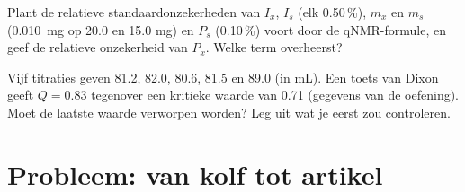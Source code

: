 \begin{exercise}[$\star\star\star$]\label{exo:b3:lab-techniques-3:11}
Plant de relatieve standaardonzekerheden van $I_x$, $I_s$ (elk 0.50\,\%), $m_x$ en $m_s$ (\qty{0.010}{mg} op 20.0
en 15.0 mg) en $P_s$ (0.10\,\%) voort door de qNMR-formule, en geef de relatieve onzekerheid van $P_x$.
Welke term overheerst?
\end{exercise}

\begin{exercise}[$\star\star\star$]\label{exo:b3:lab-techniques-3:12}
Vijf titraties geven 81.2, 82.0, 80.6, 81.5 en 89.0 (in mL). Een toets van
Dixon geeft
$Q = 0.83$ tegenover een kritieke waarde van 0.71 (gegevens van de oefening). Moet de laatste waarde
verworpen worden? Leg uit wat je eerst zou controleren.
\end{exercise}

\section{Probleem: van kolf tot artikel}

